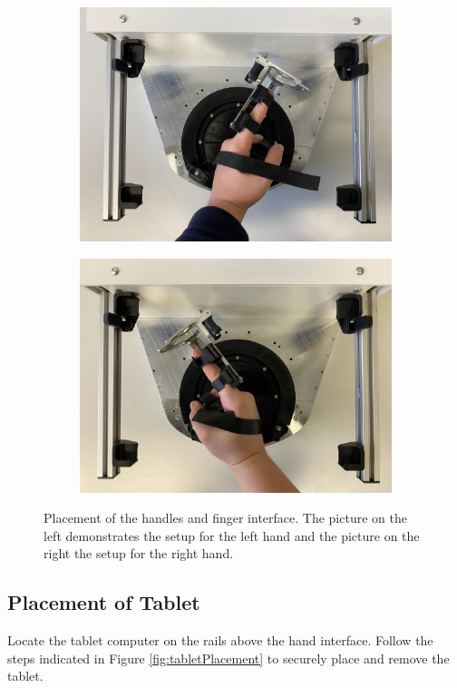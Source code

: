 \documentclass[10pt,oneside,a4paper]{article}
\begin{document}
\begin{figure}[h!]
\begin{subfigure}[b]{0.48\textwidth}
	\includegraphics[width=\textwidth]{images/Hardware/hand1.jpeg}
\end{subfigure}
\hfill
\begin{subfigure}[b]{0.48\textwidth}
	\centering
	\includegraphics[width=\textwidth]{images/Hardware/hand2.jpeg}
\end{subfigure}
\caption{Placement of the handles and finger interface. The picture on the left demonstrates the setup for the left hand and the picture on the right the setup for the right hand.}
\label{fig:HandPlacement}
\end{figure}

\subsection{Placement of Tablet}
Locate the tablet computer on the rails above the hand interface. Follow the steps indicated in Figure \ref{fig:tabletPlacement} to securely place and remove the tablet. 
\end{document}

